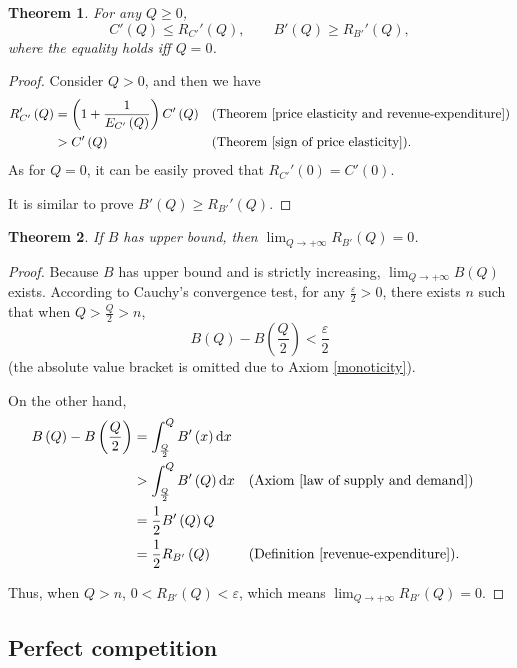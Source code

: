\documentclass{article}
\newtheorem{theorem}{Theorem}[subsection]
\begin{document}
\begin{theorem}
\label{inequality of revenue-expenditure and supply and demand}
For any $Q\ge0$,
$$C'\left(Q\right)\le R_{C'}'\left(Q\right),
\qquad B'\left(Q\right)\ge R_{B'}'\left(Q\right),$$
where the equality holds iff $Q=0$.
\end{theorem}
\begin{proof}
Consider $Q>0$, and then we have
\begin{align*}
R_{C'}'\left(Q\right)&=\left(1+\frac1{E_{C'}\left(Q\right)}\right)C'\left(Q\right)&&\text{(Theorem \ref{price elasticity and revenue-expenditure})}\\
&>C'\left(Q\right)&&\text{(Theorem \ref{sign of price elasticity})}.
\end{align*}
As for $Q=0$, it can be easily proved that $R_{C'}'\left(0\right)=C'\left(0\right)$.

It is similar to prove $B'\left(Q\right)\ge R_{B'}'\left(Q\right)$.
\end{proof}

\begin{theorem}
\label{expenditure approaches 0}
If $B$ has upper bound, then $\lim_{Q\to+\infty}R_{B'}\left(Q\right)=0$.
\end{theorem}
\begin{proof}
Because $B$ has upper bound and is strictly increasing, $\lim_{Q\to+\infty}B\left(Q\right)$ exists.
According to Cauchy's convergence test, for any $\frac\varepsilon2>0$, there exists $n$ such that
when $Q>\frac Q2>n$,
$$B\left(Q\right)-B\left(\frac Q2\right)<\frac\varepsilon2$$
(the absolute value bracket is omitted due to Axiom \ref{monoticity}).

On the other hand,
\begin{align*}
B\left(Q\right)-B\left(\frac Q2\right)&=\int_{\frac Q2}^QB'\left(x\right)\mathrm dx\\
&>\int_{\frac Q2}^QB'\left(Q\right)\mathrm dx&&\text{(Axiom \ref{law of supply and demand})}\\
&=\frac12B'\left(Q\right)Q\\
&=\frac12R_{B'}\left(Q\right)&&\text{(Definition \ref{revenue-expenditure})}.
\end{align*}

Thus, when $Q>n$, $0<R_{B'}\left(Q\right)<\varepsilon$, which means $\lim_{Q\to+\infty}R_{B'}\left(Q\right)=0$.
\end{proof}

\subsection{Perfect competition}
\label{perfect competition}
\end{document}
